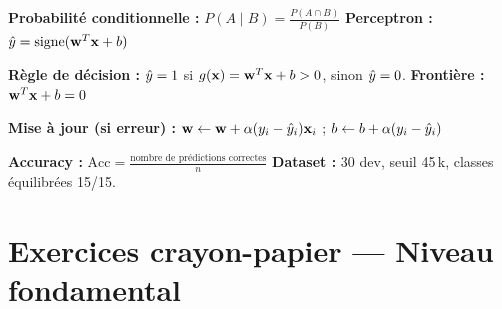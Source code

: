 %






\setlength{\parskip}{3pt}
\setlength{\abovedisplayskip}{6pt}
\setlength{\belowdisplayskip}{6pt}

\begin{tcolorbox}[
    enhanced, colback=ipssiCyan!5, colframe=ipssiCyan!50,
    boxrule=0.8pt, arc=4pt,
    title={\sffamily\bfseries Rappels --- Formules du Jour 3},
    coltitle=white, colbacktitle=ipssiCyan!70,
]
\small
\textbf{Probabilit\'{e} conditionnelle :}
$P(A \mid B) = \frac{P(A \cap B)}{P(B)}$
\hfill
\textbf{Perceptron :}
$\hat{y} = \text{signe}(\mathbf{w}^T \mathbf{x} + b)$

\medskip
\textbf{R\`{e}gle de d\'{e}cision :}
$\hat{y} = 1$ si $g(\mathbf{x}) = \mathbf{w}^T\mathbf{x} + b > 0$, sinon $\hat{y} = 0$.
\hfill
\textbf{Fronti\`{e}re :} $\mathbf{w}^T\mathbf{x} + b = 0$

\medskip
\textbf{Mise \`{a} jour (si erreur) :}
$\mathbf{w} \leftarrow \mathbf{w} + \alpha(y_i - \hat{y}_i)\mathbf{x}_i$ \;;\;
$b \leftarrow b + \alpha(y_i - \hat{y}_i)$

\medskip
\textbf{Accuracy :}
$\text{Acc} = \frac{\text{nombre de pr\'{e}dictions correctes}}{n}$
\hfill
\textbf{Dataset :} 30 dev, seuil 45\,k\texteuro, classes \'{e}quilibr\'{e}es 15/15.
\end{tcolorbox}

\section*{Exercices crayon-papier --- Niveau fondamental}


